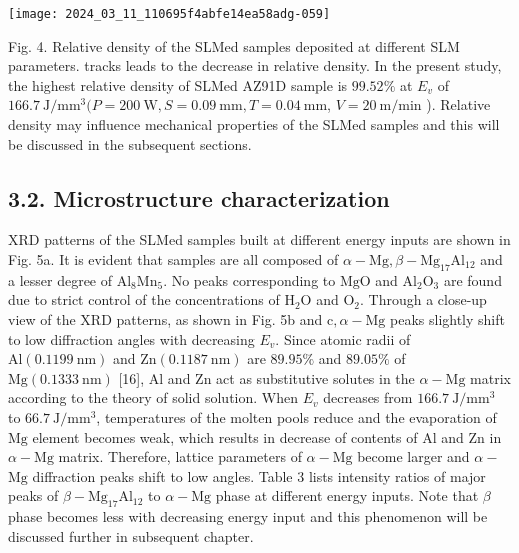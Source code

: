 \documentclass[10pt]{article}
\begin{document}
\begin{center}
\texttt{[image: 2024\_03\_11\_110695f4abfe14ea58adg-059]}
\end{center}

Fig. 4. Relative density of the SLMed samples deposited at different SLM parameters. tracks leads to the decrease in relative density. In the present study, the highest relative density of SLMed AZ91D sample is $99.52 \%$ at $E_{v}$ of $166.7 \mathrm{~J} / \mathrm{mm}^{3}(P=200 \mathrm{~W}, S=0.09 \mathrm{~mm}, T=0.04 \mathrm{~mm}$, $V=20 \mathrm{~m} / \mathrm{min}$ ). Relative density may influence mechanical properties of the SLMed samples and this will be discussed in the subsequent sections.

\subsection*{3.2. Microstructure characterization}
XRD patterns of the SLMed samples built at different energy inputs are shown in Fig. 5a. It is evident that samples are all composed of $\alpha-\mathrm{Mg}, \beta-\mathrm{Mg}_{17} \mathrm{Al}_{12}$ and a lesser degree of $\mathrm{Al}_{8} \mathrm{Mn}_{5}$. No peaks corresponding to $\mathrm{MgO}$ and $\mathrm{Al}_{2} \mathrm{O}_{3}$ are found due to strict control of the concentrations of $\mathrm{H}_{2} \mathrm{O}$ and $\mathrm{O}_{2}$. Through a close-up view of the XRD patterns, as shown in Fig. 5b and $\mathrm{c}, \alpha-\mathrm{Mg}$ peaks slightly shift to low diffraction angles with decreasing $E_{v}$. Since atomic radii of $\mathrm{Al}(0.1199 \mathrm{~nm})$ and $\mathrm{Zn}(0.1187 \mathrm{~nm})$ are $89.95 \%$ and $89.05 \%$ of $\mathrm{Mg}(0.1333 \mathrm{~nm})$ [16], $\mathrm{Al}$ and $\mathrm{Zn}$ act as substitutive solutes in the $\alpha-\mathrm{Mg}$ matrix according to the theory of solid solution. When $E_{v}$ decreases from $166.7 \mathrm{~J} / \mathrm{mm}^{3}$ to $66.7 \mathrm{~J} / \mathrm{mm}^{3}$, temperatures of the molten pools reduce and the evaporation of $\mathrm{Mg}$ element becomes weak, which results in decrease of contents of $\mathrm{Al}$ and $\mathrm{Zn}$ in $\alpha-\mathrm{Mg}$ matrix. Therefore, lattice parameters of $\alpha-\mathrm{Mg}$ become larger and $\alpha-$ $\mathrm{Mg}$ diffraction peaks shift to low angles. Table 3 lists intensity ratios of major peaks of $\beta-\mathrm{Mg}_{17} \mathrm{Al}_{12}$ to $\alpha-\mathrm{Mg}$ phase at different energy inputs. Note that $\beta$ phase becomes less with decreasing energy input and this phenomenon will be discussed further in subsequent chapter.
\end{document}
